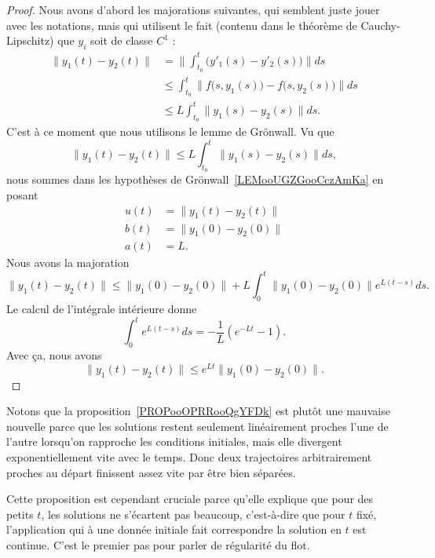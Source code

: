 \begin{proof}
	Nous avons d'abord les majorations suivantes, qui semblent juste jouer avec les notations, mais qui utilisent le fait (contenu dans le théorème de Cauchy-Lipschitz) que \( y_i\) soit de classe \( C^1\) :
	\begin{subequations}
		\begin{align}
			\| y_1(t)-y_2(t) \| & =\| \int_{t_0}^t\big( y'_1(s)-y'_2(s) \big) \|ds                     \\
			                    & \leq \int_{t_0}^t\| f\big( s,y_1(s) \big)-f\big( s,y_2(s) \big) \|ds \\
			                    & \leq L\int_{t_0}^t\| y_1(s)-y_2(s) \|ds.
		\end{align}
	\end{subequations}
	C'est à ce moment que nous utilisons le lemme de Grönwall. Vu que
	\begin{equation}
		\| y_1(t)-y_2(t) \|\leq L\int_{t_0}^t\| y_1(s)-y_2(s) \|ds,
	\end{equation}
	nous sommes dans les hypothèses de Grönwall~\ref{LEMooUGZGooCczAmKa} en posant
	\begin{subequations}
		\begin{align}
			u(t) & =\| y_1(t)-y_2(t) \| \\
			b(t) & =\| y_1(0)-y_2(0) \| \\
			a(t) & =L.
		\end{align}
	\end{subequations}
	Nous avons la majoration
	\begin{equation}
		\| y_1(t)-y_2(t) \|\leq \| y_1(0)-y_2(0) \|+L\int_0^t\| y_1(0)-y_2(0) \| e^{L(t-s)}ds.
	\end{equation}
	Le calcul de l'intégrale intérieure donne
	\begin{equation}
		\int_0^t e^{L(t-s)}ds=-\frac{1}{ L }( e^{-Lt}-1).
	\end{equation}
	Avec ça, nous avons
	\begin{equation}
		\| y_1(t)-y_2(t) \|\leq  e^{Lt}\| y_1(0)-y_2(0) \|.
	\end{equation}
\end{proof}

\begin{normaltext}
	Notons que la proposition~\ref{PROPooOPRRooQgYFDk} est plutôt une mauvaise nouvelle parce que les solutions restent seulement linéairement proches l'une de l'autre lorsqu'on rapproche les conditions initiales, mais elle divergent exponentiellement vite avec le temps. Donc deux trajectoires arbitrairement proches au départ finissent assez vite par être bien séparées.

	Cette proposition est cependant cruciale parce qu'elle explique que pour des petits \( t\), les solutions ne s'écartent pas beaucoup, c'est-à-dire que pour \( t\) fixé, l'application qui à une donnée initiale fait correspondre la solution en \( t\) est continue. C'est le premier pas pour parler de régularité du flot.

\end{normaltext}

